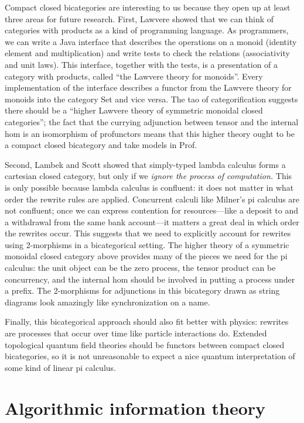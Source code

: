\documentclass[12pt,twoside,openright]{report}
\begin{document}
Compact closed bicategories are interesting to us because they open up at least three areas for future research.  First, Lawvere showed that we can think of categories with products as a kind of programming language.  As programmers, we can write a Java interface that describes the operations on a monoid (identity element and multiplication) and write tests to check the relations (associativity and unit laws).  This interface, together with the tests, is a presentation of a category with products, called ``the Lawvere theory for monoids''.  Every implementation of the interface describes a functor from the Lawvere theory for monoids into the category Set and vice versa.  The tao of categorification suggests there should be a ``higher Lawvere theory of symmetric monoidal closed categories''; the fact that the currying adjunction between tensor and the internal hom is an isomorphism of profunctors means that this higher theory ought to be a compact closed bicategory and take models in Prof.

Second, Lambek and Scott showed that simply-typed lambda calculus forms a cartesian closed category, but only if we {\em ignore the process of computation.}  This is only possible because lambda calculus is confluent: it does not matter in what order the rewrite rules are applied.  Concurrent calculi like Milner's pi calculus are not confluent; once we can express contention for resources---like a deposit to and a withdrawal from the same bank account---it matters a great deal in which order the rewrites occur.  This suggests that we need to explicitly account for rewrites using 2-morphisms in a bicategorical setting.  The higher theory of a symmetric monoidal closed category above provides many of the pieces we need for the pi calculus: the unit object can be the zero process, the tensor product can be concurrency, and the internal hom should be involved in putting a process under a prefix.  The 2-morphisms for adjunctions in this bicategory drawn as string diagrams look amazingly like synchronization on a name.

Finally, this bicategorical approach should also fit better with physics: rewrites are processes that occur over time like particle interactions do.  Extended topological quantum field theories should be functors between compact closed bicategories, so it is not unreasonable to expect a nice quantum interpretation of some kind of linear pi calculus.

\setcounter{chapter}{0}
\part{Algorithmic information theory}
\end{document}
